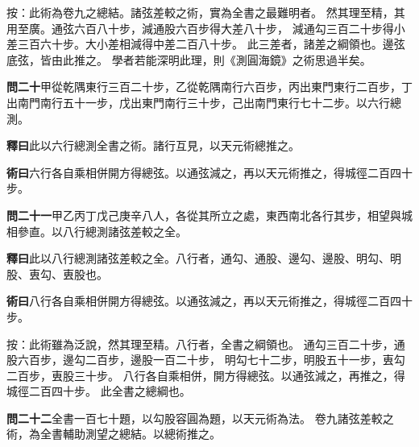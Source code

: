 \documentclass[12pt,a4paper]{article}
\begin{document}
\noindent
按：此術為卷九之總結。諸弦差較之術，實為全書之最難明者。
然其理至精，其用至廣。通弦六百八十步，減通股六百步得大差八十步，
減通勾三百二十步得小差三百六十步。大小差相減得中差二百八十步。
此三差者，諸差之綱領也。邊弦底弦，皆由此推之。
學者若能深明此理，則《測圓海鏡》之術思過半矣。

\vspace{0.5em}

\noindent\textbf{問二十}\quad 甲從乾隅東行三百二十步，乙從乾隅南行六百步，丙出東門東行二百步，丁出南門南行五十一步，戊出東門南行三十步，己出南門東行七十二步。以六行總測。

\vspace{0.3em}

\noindent\textbf{釋曰}\quad 此以六行總測全書之術。諸行互見，以天元術總推之。

\vspace{0.3em}

\noindent\textbf{術曰}\quad 六行各自乘相併開方得總弦。以通弦減之，再以天元術推之，得城徑二百四十步。

\vspace{0.5em}

\noindent\textbf{問二十一}\quad 甲乙丙丁戊己庚辛八人，各從其所立之處，東西南北各行其步，相望與城相參直。以八行總測諸弦差較之全。

\vspace{0.3em}

\noindent\textbf{釋曰}\quad 此以八行總測諸弦差較之全。八行者，通勾、通股、邊勾、邊股、明勾、明股、叀勾、叀股也。

\vspace{0.3em}

\noindent\textbf{術曰}\quad 八行各自乘相併開方得總弦。以通弦減之，再以天元術推之，得城徑二百四十步。

\vspace{0.3em}

\noindent
按：此術雖為泛說，然其理至精。八行者，全書之綱領也。
通勾三百二十步，通股六百步，邊勾二百步，邊股一百二十步，
明勾七十二步，明股五十一步，叀勾二百步，叀股三十步。
八行各自乘相併，開方得總弦。以通弦減之，再推之，得城徑二百四十步。
此全書之總綱也。

\vspace{0.5em}

\noindent\textbf{問二十二}\quad 全書一百七十題，以勾股容圓為題，以天元術為法。
卷九諸弦差較之術，為全書輔助測望之總結。以總術推之。

\vspace{0.3em}
\end{document}
